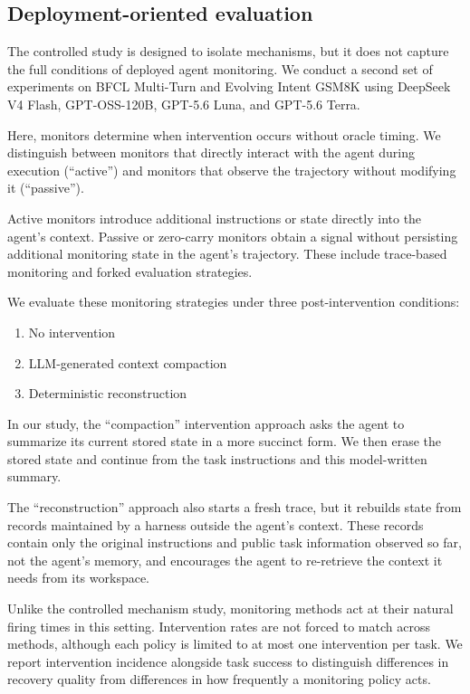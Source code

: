\documentclass{article}
\begin{document}
\subsection{Deployment-oriented evaluation}

The controlled study is designed to isolate mechanisms, but it does not capture the full conditions of deployed agent monitoring. We conduct a second set of experiments on BFCL Multi-Turn and Evolving Intent GSM8K using DeepSeek V4 Flash, GPT-OSS-120B, GPT-5.6 Luna, and GPT-5.6 Terra.

Here, monitors determine when intervention occurs without oracle timing. We distinguish between monitors that directly interact with the agent during execution (``active'') and monitors that observe the trajectory without modifying it (``passive'').

Active monitors introduce additional instructions or state directly into the agent's context. Passive or zero-carry monitors obtain a signal without persisting additional monitoring state in the agent's trajectory. These include trace-based monitoring and forked evaluation strategies.

We evaluate these monitoring strategies under three post-intervention conditions:
\begin{enumerate}
  \item No intervention
  \item LLM-generated context compaction
  \item Deterministic reconstruction
\end{enumerate}

In our study, the ``compaction'' intervention approach asks the agent to summarize its current stored state in a more succinct form. We then erase the stored state and continue from the task instructions and this model-written summary.

The ``reconstruction'' approach also starts a fresh trace, but it rebuilds state from records maintained by a harness outside the agent's context. These records contain only the original instructions and public task information observed so far, not the agent's memory, and encourages the agent to re-retrieve the context it needs from its workspace.

Unlike the controlled mechanism study, monitoring methods act at their natural firing times in this setting. Intervention rates are not forced to match across methods, although each policy is limited to at most one intervention per task. We report intervention incidence alongside task success to distinguish differences in recovery quality from differences in how frequently a monitoring policy acts.
\end{document}
